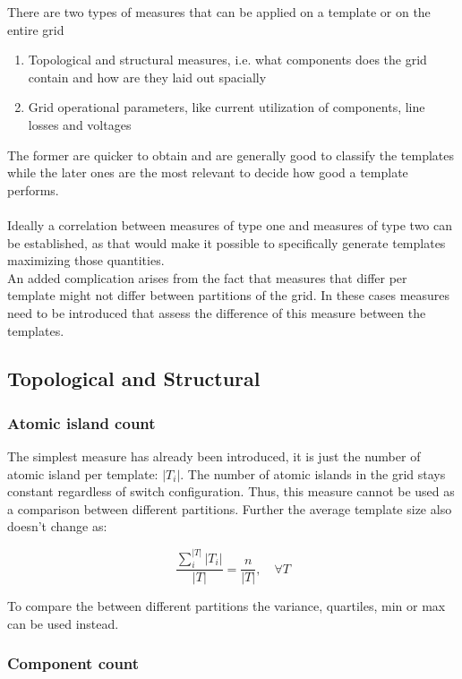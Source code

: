 There are two types of measures that can be applied on a template or on the entire grid 
\begin{enumerate}
  \item Topological and structural measures, i.e. what components does the grid contain
  and how are they laid out spacially
  \item Grid operational parameters, like current utilization of components, line losses
  and voltages
\end{enumerate}

The former are quicker to obtain and are generally good to classify the templates while
the later ones are the most relevant to decide how good a template performs.\\
\\
Ideally a correlation between measures of type one and measures of type two can be
established, as that would make it possible to specifically generate templates
maximizing those quantities.
\\
An added complication arises from the fact that measures that differ per template
might not differ between partitions of the grid. In these cases measures need to be introduced
that assess the difference of this measure between the templates. 

\subsection{Topological and Structural}

\subsubsection{Atomic island count}

The simplest measure has already been introduced, it is just the number
of atomic island per template: $|T_i|$. The number of atomic
islands in the grid stays constant regardless of switch configuration.
Thus, this measure cannot be used as a comparison between different
partitions.
Further the average template size also doesn't change as: 

\begin{equation}
  \frac{\sum_i^{|T|} |T_i|}{|T|} = \frac{n}{|T|}, \quad \forall T
\end{equation}

To compare the between different partitions the variance, quartiles,
min or max can be used instead.

\subsubsection{Component count}


